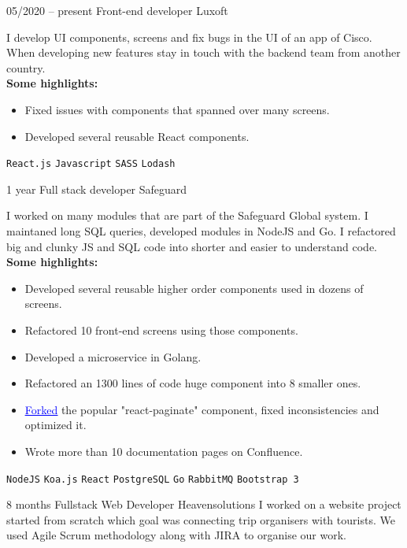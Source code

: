 \documentclass[9pt]{developercv} %
\begin{document}
\begin{entrylist}
	\entry
		{05/2020 -- present}
		{Front-end developer}
		{Luxoft}
		{ I develop UI components, screens and fix bugs in the UI of an app of Cisco. When developing new features stay in touch with
		  the backend team from another country.
		\\   \textbf{Some highlights:}
		\begin{itemize}
			\setlength\itemsep{0em}
				\item Fixed issues with components that spanned over many screens.
				\item Developed several reusable React components.
		\end{itemize}
        \texttt{React.js}\slashsep
		\texttt{Javascript}\slashsep
		\texttt{SASS}\slashsep
		\texttt{Lodash}\slashsep
		}
	\entry
		{1 year}
		{Full stack developer}
		{Safeguard}
		{I worked on many modules that are part of the Safeguard Global system. I maintaned 
		long SQL queries, developed modules in NodeJS and Go. I refactored big and
		 clunky JS and SQL code into shorter and easier to understand code. 
		\\   \textbf{Some highlights:}
		\begin{itemize}
			\setlength\itemsep{0em}
				\item Developed several reusable higher order components used in dozens of screens. 
				\item Refactored 10 front-end screens using those components. 
				\item Developed a microservice in Golang. 
				\item Refactored an 1300 lines of code huge component into 8 smaller ones.
				\item \href{https://www.npmjs.com/package/react-paginate-next}{\textcolor{blue}{\underline{Forked}}} the popular "react-paginate" component, fixed inconsistencies and optimized it.
				\item Wrote more than 10 documentation pages on Confluence.
		\end{itemize}
		\texttt{NodeJS}\slashsep
		\texttt{Koa.js}\slashsep
		\texttt{React}\slashsep
		\texttt{PostgreSQL}\slashsep
		\texttt{Go}\slashsep
		\texttt{RabbitMQ}\slashsep
		\texttt{Bootstrap 3}
		}
	\entry
		{8 months}
		{Fullstack Web Developer}
		{Heavensolutions}
		{I worked on a website project started from scratch which goal was connecting trip organisers 
		with tourists. We used Agile Scrum methodology along with JIRA to organise our work. 
}
\end{entrylist}
\end{document}
